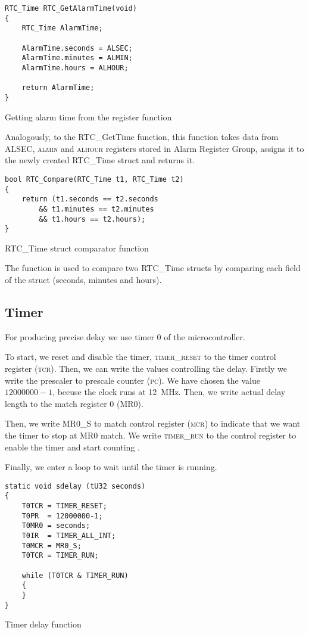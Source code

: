 \documentclass[10pt]{article}
\begin{document}
\begin{program}[H]
	\begin{lstlisting}
RTC_Time RTC_GetAlarmTime(void)
{
	RTC_Time AlarmTime;

	AlarmTime.seconds = ALSEC;
	AlarmTime.minutes = ALMIN;
	AlarmTime.hours = ALHOUR;

	return AlarmTime;
}
	\end{lstlisting}
	\caption{Getting alarm time from the register function}
\end{program}
Analogously, to the RTC\_GetTime function, this function takes data from \textsc{ALSEC}, \textsc{almin} and \textsc{alhour} registers stored in Alarm Register Group, assigns it to the newly created RTC\_Time struct and returns it.


\begin{program}[H]
	\begin{lstlisting}
bool RTC_Compare(RTC_Time t1, RTC_Time t2)
{
	return (t1.seconds == t2.seconds
		&& t1.minutes == t2.minutes
		&& t1.hours == t2.hours);
}
	\end{lstlisting}
	\caption{RTC\_Time struct comparator function}
\end{program}
The function is used to compare two RTC\_Time structs by comparing each field of the struct (seconds, minutes and hours).

\pagebreak
\subsection{Timer}

For producing precise delay we use timer 0 of the microcontroller.
    
To start, we reset and disable the timer, \textsc{timer\_reset} to the timer control register (\textsc{tcr}). 
Then, we can write the values controlling the delay.
Firstly we write the prescaler to prescale counter (\textsc{pc}).
We have chosen the value \(12000000 - 1\), becuse the clock runs at 12\ MHz.
Then, we write actual delay length to the match register 0 ({\small MR0}).

Then, we write {\small MR0\_S} to match control register (\textsc{mcr}) to indicate that we want the timer to stop at {\small MR0} match.
We write \textsc{timer\_run} to the control register to enable the timer and start counting \cite[p.251]{lpc2148-manual}.

Finally, we enter a loop to wait until the timer is running.

\begin{program}[H]
	\begin{lstlisting}
static void sdelay (tU32 seconds)
{
    T0TCR = TIMER_RESET;  
    T0PR  = 12000000-1;             
    T0MR0 = seconds;
    T0IR  = TIMER_ALL_INT;          
    T0MCR = MR0_S;      
    T0TCR = TIMER_RUN;  

    while (T0TCR & TIMER_RUN)
    {
    }
}
	\end{lstlisting}
	\caption{Timer delay function}
\end{program}
\end{document}
